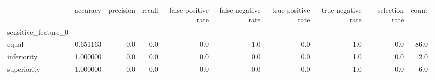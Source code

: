 \begin{tabular}{lrrrrrrrrr}
\toprule
{} &  accuracy &  precision &  recall &  false positive rate &  false negative rate &  true positive rate &  true negative rate &  selection rate &  count \\
sensitive\_feature\_0 &           &            &         &                      &                      &                     &                     &                 &        \\
\midrule
equal               &  0.651163 &        0.0 &     0.0 &                  0.0 &                  1.0 &                 0.0 &                 1.0 &             0.0 &   86.0 \\
inferiority         &  1.000000 &        0.0 &     0.0 &                  0.0 &                  0.0 &                 0.0 &                 1.0 &             0.0 &    2.0 \\
superiority         &  1.000000 &        0.0 &     0.0 &                  0.0 &                  0.0 &                 0.0 &                 1.0 &             0.0 &    6.0 \\
\bottomrule
\end{tabular}
